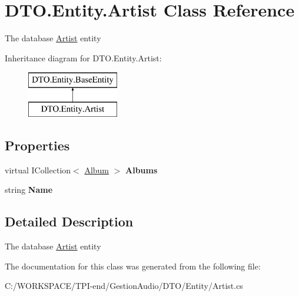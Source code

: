 \hypertarget{class_d_t_o_1_1_entity_1_1_artist}{}\section{D\+T\+O.\+Entity.\+Artist Class Reference}
\label{class_d_t_o_1_1_entity_1_1_artist}


The database \hyperlink{class_d_t_o_1_1_entity_1_1_artist}{Artist} entity  


Inheritance diagram for D\+T\+O.\+Entity.\+Artist\+:\begin{figure}[H]
\begin{center}
\leavevmode
\includegraphics[height=2.000000cm]{class_d_t_o_1_1_entity_1_1_artist}
\end{center}
\end{figure}
\subsection*{Properties}
\begin{DoxyCompactItemize}
\item 
\mbox{\label{class_d_t_o_1_1_entity_1_1_artist_a1bc514b69f4031bc7be26a11afac7ce2}} 
virtual I\+Collection$<$ \hyperlink{class_d_t_o_1_1_entity_1_1_album}{Album} $>$ {\bfseries Albums}
\item 
\mbox{\label{class_d_t_o_1_1_entity_1_1_artist_a57376a1185e8c279676df7271686d59f}} 
string {\bfseries Name}
\end{DoxyCompactItemize}


\subsection{Detailed Description}
The database \hyperlink{class_d_t_o_1_1_entity_1_1_artist}{Artist} entity 



The documentation for this class was generated from the following file\+:\begin{DoxyCompactItemize}
\item 
C\+:/\+W\+O\+R\+K\+S\+P\+A\+C\+E/\+T\+P\+I-\/end/\+Gestion\+Audio/\+D\+T\+O/\+Entity/Artist.\+cs\end{DoxyCompactItemize}

